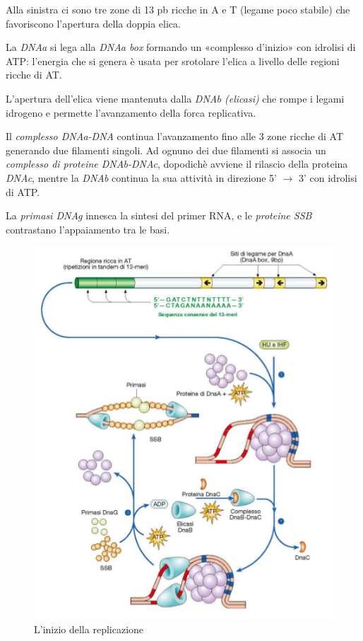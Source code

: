 \documentclass[11pt]{book}
\begin{document}
Alla sinistra ci sono tre zone di 13 pb ricche in A e T (legame poco stabile) che favoriscono l’apertura della doppia elica.

\vspace{1em}
La \emph{DNAa} si lega alla \emph{DNAa box} formando un «complesso d’inizio» con idrolisi di ATP: l’energia che si genera è usata per srotolare l’elica a livello delle regioni ricche di AT.

L'apertura dell’elica viene mantenuta dalla \emph{DNAb (elicasi)} che rompe i legami idrogeno e permette l’avanzamento della forca replicativa.

Il \emph{complesso DNAa-DNA} continua l’avanzamento fino alle 3 zone ricche di AT generando due filamenti singoli.
Ad ognuno dei due filamenti si associa un \emph{complesso di proteine DNAb-DNAc}, dopodichè avviene il rilascio della proteina \emph{DNAc}, mentre la \emph{DNAb} continua la sua attività in direzione 5’ $\to$ 3’ con idrolisi di ATP.

La \emph{primasi DNAg} innesca la sintesi del primer RNA, e le \emph{proteine SSB} contrastano l’appaiamento tra le basi. 

\clearpage
\begin{figure}[htp]
\centering
\includegraphics[scale=0.5]{img/Inizio dell replicazione.png}
\caption{L'inizio della replicazione}
\label{}
\end{figure}
\end{document}
